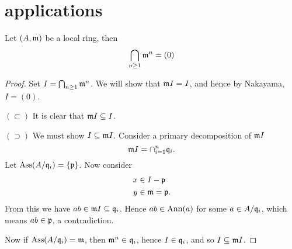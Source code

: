 \documentclass{ximera}
\begin{document}


\section{applications}

\begin{corollary}
  Let $(A,\mathfrak{m})$ be a local ring, then
  \[
  \bigcap_{n\ge 1} \mathfrak{m}^n  = (0)
  \]
  \begin{proof}
    Set $I = \bigcap_{n\ge 1} \mathfrak{m}^n$. We will show that $\mathfrak{m} I = I$, and
    hence by Nakayama, $I = (0)$.

    $(\subset)$ It is clear that $\mathfrak{m} I \subseteq I$.

    $(\supset)$ We must show $I\subseteq \mathfrak{m} I$. Consider a primary
    decomposition of $\mathfrak{m} I$
    \[
    \mathfrak{m} I = \cap_{i=1}^n \mathfrak{q}_i.
    \]
    Let $\operatorname{Ass}(A/\mathfrak{q}_i) = \{\mathfrak{p}\}$. Now consider
    \begin{align*}
      x &\in I -\mathfrak{p}\\
      y &\in \mathfrak{m} = \mathfrak{p}.
    \end{align*}
    From this we have $ab\in\mathfrak{m} I \subseteq \mathfrak{q}_i$. Hence $ab\in\operatorname{Ann}(a)$
    for some $a\in A/\mathfrak{q}_i$, which means $ab\in \mathfrak{p}$, a contradiction.

    Now if $\operatorname{Ass}(A/\mathfrak{q}_i) = \mathfrak{m}$, then $\mathfrak{m}^n\in\mathfrak{q}_i$, hence $I\in\mathfrak{q}_i$,
    and so $I\subseteq \mathfrak{m} I$.
  \end{proof}
\end{corollary}
\end{document}
